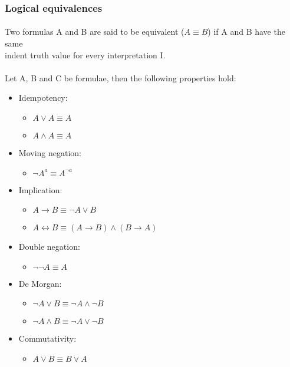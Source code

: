 \documentclass[part1.tex]{subfiles}
\begin{document}
\subsubsection{Logical equivalences}
\paragraph{} Two formulas A and B are said to be equivalent (\(A \equiv B\)) if A and B have the same \\
indent truth value for every interpretation I.
\paragraph{} Let A, B and C be formulae, then the following
properties hold:
\begin{itemize}
\item Idempotency:
  \begin{itemize}
    \item $A \vee A \equiv A$
    \item $A \wedge A \equiv A$
  \end{itemize}
\item Moving negation:
  \begin{itemize}
          \item $\neg A^{a} \equiv A^{\neg a}$
  \end{itemize}
\item Implication:
  \begin{itemize}
   \item $A \rightarrow B \equiv \neg A \vee B$
   \item $A \leftrightarrow B \equiv (A \rightarrow B) \wedge (B
     \rightarrow A)$
  \end{itemize}
\item Double negation:
  \begin{itemize}
    \item $\neg\neg{A} \equiv A$
  \end{itemize}
\item De Morgan:
  \begin{itemize}
    \item $\neg{A \vee B} \equiv \neg{A} \wedge \neg{B}$
    \item $\neg{A \wedge B} \equiv \neg{A} \vee \neg{B}$
  \end{itemize}
\item Commutativity:
  \begin{itemize}
    \item $A \vee B \equiv B \vee A$

\end{itemize}
\end{itemize}
\end{document}
